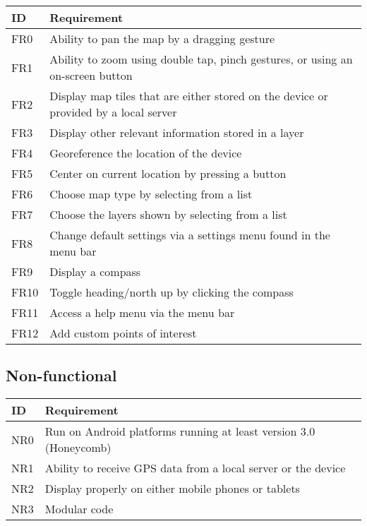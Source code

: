 \documentclass{article}
\begin{document}
\begin{tabular}{ | p{.5in} | p{5in} | }
\hline
\textbf{ID} & \textbf{Requirement}\\
\hline
\hline
FR0 & Ability to pan the map by a dragging gesture\\
\hline
FR1 & Ability to zoom using double tap, pinch gestures, or using an on-screen button\\
\hline
FR2 & Display map tiles that are either stored on the device or provided by a local server\\
\hline
FR3 & Display other relevant information stored in a layer\\
\hline
FR4 & Georeference the location of the device\\
\hline
FR5 & Center on current location by pressing a button\\
\hline
FR6 & Choose map type by selecting from a list\\
\hline
FR7 & Choose the layers shown by selecting from a list\\
\hline
FR8 & Change default settings via a settings menu found in the menu bar\\
\hline
FR9 & Display a compass\\
\hline
FR10 & Toggle heading/north up by clicking the compass\\
\hline
FR11 & Access a help menu via the menu bar\\
\hline
FR12 & Add custom points of interest\\
\hline
\end{tabular}

\subsection{Non-functional}

\begin{tabular}{ | p{.5in} | p{5in} | }
\hline
\textbf{ID} & \textbf{Requirement}\\
\hline
\hline
NR0 & Run on Android platforms running at least version 3.0 (Honeycomb)\\
\hline
NR1 & Ability to receive GPS data from a local server or the device\\
\hline
NR2 & Display properly on either mobile phones or tablets\\
\hline
NR3 & Modular code\\
\hline
\end{tabular}
\end{document}
